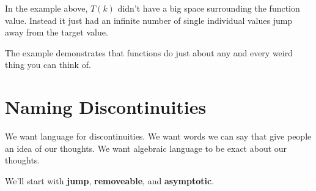 \documentclass{ximera}
\begin{document}
In the example above, $T(k)$ didn't have a big space surrounding the function value.  Instead it just had an infinite number of single individual values jump away from the target value.


The example demonstrates that functions do just about any and every weird thing you can think of.













\section{Naming Discontinuities}



We want language for discontinuities.  We want words we can say that give people an idea of our thoughts. We want algebraic language to be exact about our thoughts.


We'll start with \textbf{jump}, \textbf{removeable}, and \textbf{asymptotic}.
\end{document}
